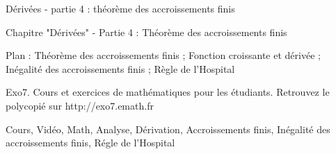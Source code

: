 
Dérivées - partie 4 : théorème des accroissements finis



Chapitre "Dérivées" - Partie 4 : Théorème des accroissements finis

Plan : Théorème des accroissements finis ; Fonction croissante et dérivée ; 
Inégalité des accroissements finis ; Règle de l'Hospital

Exo7. Cours et exercices de mathématiques pour les étudiants.
Retrouvez le polycopié sur http://exo7.emath.fr


Cours, Vidéo, Math, Analyse, Dérivation, Accroissements finis, 
Inégalité des accroissements finis, Régle de l'Hospital



